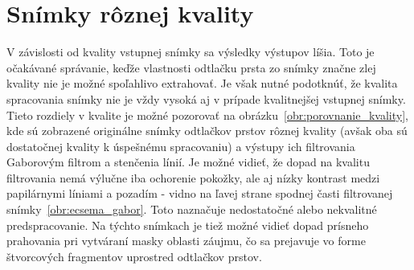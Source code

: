   \section{Snímky rôznej kvality}
  V závislosti od kvality vstupnej snímky sa výsledky výstupov líšia. Toto je očakávané správanie, keďže vlastnosti odtlačku prsta zo snímky značne zlej
  kvality nie je možné spoľahlivo extrahovať. Je však nutné podotknúť, že kvalita spracovania snímky nie je vždy vysoká aj v prípade kvalitnejšej vstupnej
  snímky. Tieto rozdiely v kvalite je možné pozorovať na obrázku~{\ref{obr:porovnanie_kvality}}, kde sú zobrazené originálne snímky odtlačkov prstov rôznej
  kvality
  (avšak oba sú dostatočnej kvality k úspešnému spracovaniu) a výstupy ich filtrovania Gaborovým filtrom a stenčenia línií. Je možné vidieť, že dopad na kvalitu
  filtrovania nemá výlučne iba ochorenie pokožky, ale aj nízky kontrast medzi papilárnymi líniami a pozadím - vidno na ľavej strane spodnej časti filtrovanej
  snímky~{\ref{obr:ecsema_gabor}}. Toto naznačuje nedostatočné alebo nekvalitné predspracovanie. Na týchto snímkach je tiež možné vidieť dopad prísneho
  prahovania pri vytváraní masky oblasti záujmu, čo sa prejavuje vo forme štvorcových fragmentov uprostred odtlačkov prstov.

